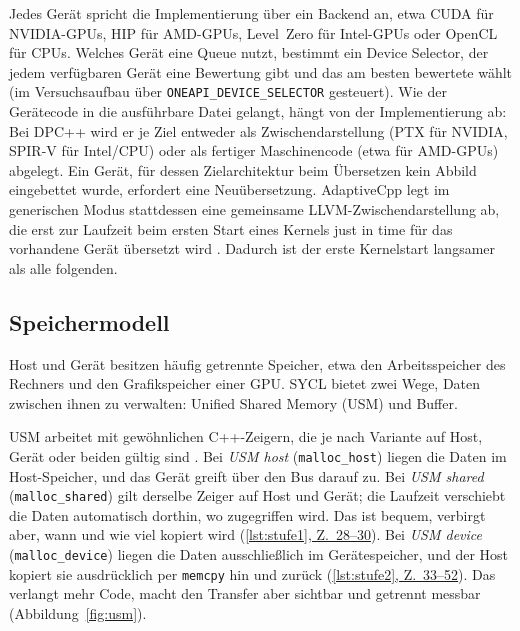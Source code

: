 \documentclass[12pt,a4paper]{article}
\newcommand{\stelle}[2]{(\hyperref[#1]{\ref*{#1}, Z.~#2})}
\begin{document}
Jedes Gerät spricht die Implementierung über ein Backend an, etwa CUDA für
NVIDIA-GPUs, HIP für AMD-GPUs, Level~Zero für Intel-GPUs oder OpenCL für
CPUs. Welches Gerät eine Queue nutzt, bestimmt ein Device Selector, der jedem
verfügbaren Gerät eine Bewertung gibt und das am besten bewertete wählt (im
Versuchsaufbau über \texttt{ONEAPI\_DEVICE\_SELECTOR} gesteuert). Wie der
Gerätecode in die ausführbare Datei gelangt, hängt von der Implementierung ab:
Bei DPC++ wird er je Ziel entweder als Zwischendarstellung (PTX für NVIDIA,
SPIR-V für Intel/CPU) oder als fertiger Maschinencode (etwa für AMD-GPUs)
abgelegt. Ein Gerät, für dessen Zielarchitektur beim Übersetzen kein Abbild
eingebettet wurde, erfordert eine Neuübersetzung. AdaptiveCpp legt im
generischen Modus stattdessen eine gemeinsame LLVM-Zwischendarstellung ab, die
erst zur Laufzeit beim ersten Start eines Kernels just in time für das vorhandene
Gerät übersetzt wird \cite{alpay2023sscp}. Dadurch ist der erste Kernelstart
langsamer als alle folgenden.

\subsection{Speichermodell}\label{sec:k-speicher}

Host und Gerät besitzen häufig getrennte Speicher, etwa den Arbeitsspeicher
des Rechners und den Grafikspeicher einer GPU\@. SYCL bietet zwei Wege, Daten
zwischen ihnen zu verwalten: Unified Shared Memory (USM) und Buffer.

USM arbeitet mit gewöhnlichen C++-Zeigern, die je nach Variante auf Host, Gerät
oder beiden gültig sind \cite{khronos2020sycl}. Bei \emph{USM host}
(\texttt{malloc\_host}) liegen die Daten im Host-Speicher, und das Gerät
greift über den Bus darauf zu. Bei \emph{USM shared} (\texttt{malloc\_\allowbreak shared})
gilt derselbe Zeiger auf Host und Gerät; die Laufzeit verschiebt die Daten
automatisch dorthin, wo zugegriffen wird. Das ist bequem, verbirgt aber, wann
und wie viel kopiert wird \stelle{lst:stufe1}{28--30}. Bei \emph{USM device}
(\texttt{malloc\_device}) liegen die Daten ausschließlich im Gerätespeicher,
und der Host kopiert sie ausdrücklich per \texttt{memcpy} hin und zurück
\stelle{lst:stufe2}{33--52}. Das verlangt mehr Code, macht den Transfer aber
sichtbar und getrennt messbar (Abbildung~\ref{fig:usm}).
\end{document}
